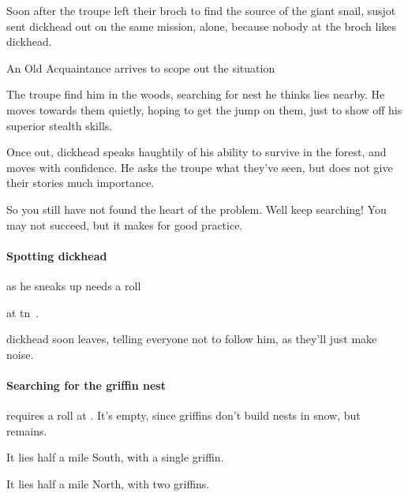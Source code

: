 \begin{multicols}{2}

\noindent
Soon after the troupe left their \gls{broch} to find the source of the giant snail, \gls{susjot} sent \gls{dickhead} out on the same mission, alone, because nobody at the \gls{broch} likes \gls{dickhead}.

{An Old Acquaintance}%
{ arrives to scope out the situation}%

The troupe find him in the woods, searching for  nest he thinks lies nearby.
He moves towards them quietly, hoping to get the jump on them, just to show off his superior stealth \glspl{skill}.

Once out, \gls{dickhead} speaks haughtily of his ability to survive in the forest, and moves with confidence.
He asks the troupe what they've seen, but does not give their stories much importance.

\begin{speechtext}
  So you still have not found the heart of the problem.
  Well keep searching!
  You may not succeed, but it makes for good practice.
\end{speechtext}

\dickhead

\paragraph{Spotting \gls{dickhead}}
as he sneaks up needs a  roll
%
\addtocounter{track}{\value{Dexterity}}%
\addtocounter{track}{\value{Stealth}}%
at \gls{tn}~.

\Gls{dickhead} soon leaves, telling everyone not to follow him, as they'll just make noise.

\label{sunwayAirIngredients}
\paragraph{Searching for the \gls{griffin} nest}
requires a  roll at \tn[12].
\ifcase\value{temperature}%
  It's empty, since \glspl{griffin} don't build nests in snow, but  remains.

\or%
  It lies half a mile South, with a single \gls{griffin}.

\or
  It lies half a mile North, with two \glspl{griffin}.


\end{multicols}
